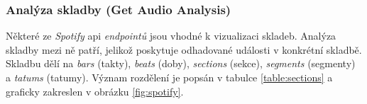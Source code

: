 \documentclass[thesis=B, czech]{FITthesis}[2019/03/06]
\begin{document}
\subsubsection*{Analýza skladby (Get Audio Analysis)}

Některé ze \textit{Spotify} \gls{api} \textit{endpointů} jsou vhodné k vizualizaci skladeb. Analýza skladby mezi ně patří, jelikož poskytuje odhadované události v konkrétní skladbě. Skladbu dělí na \textit{bars} (takty), \textit{beats} (doby), \textit{sections} (sekce), \textit{segments} (segmenty) a \textit{tatums} (tatumy). Význam rozdělení je popsán v tabulce \ref{table:sections} a graficky zakreslen v obrázku \ref{fig:spotify}.






\end{document}
